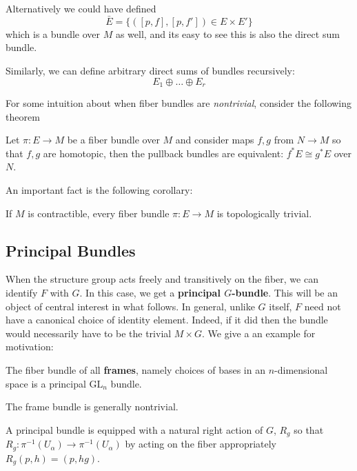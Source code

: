 		Alternatively we could have defined 
		\begin{equation}
			\bar E = \{ ([p, f], [p, f']) \in E \times E'\}
		\end{equation}
		which is a bundle over $M$ as well, and its easy to see this is also the direct sum bundle. 
		
		Similarly, we can define arbitrary direct sums of bundles recursively:
		\begin{equation}
			E_1 \oplus \dots \oplus E_r 
		\end{equation}
		
		
		For some intuition about when fiber bundles are \emph{nontrivial}, consider the following theorem
		\begin{theorem}
			Let $\pi:E \rightarrow M$ be a fiber bundle over $M$ and consider maps $f, g$ from $N \rightarrow M$ so that $f, g$ are homotopic, then the pullback bundles are equivalent: $f^* E \cong g^* E$ over $N$.
		\end{theorem}
		An important fact is the following corollary:
		\begin{cor}
			If $M$ is contractible, every fiber bundle $\pi: E \rightarrow M$ is topologically trivial.
		\end{cor}
		
		\subsection{Principal Bundles}
		
		When the structure group acts freely and transitively on the fiber, we can identify $F$ with $G$. In this case, we get a \textbf{principal $G$-bundle}. This will be an object of central interest in what follows. In general, unlike $G$ itself, $F$ need not have a canonical choice of identity element. Indeed, if it did then the bundle would necessarily have to be the trivial $M \times G$. We give a an example for motivation:
		\begin{eg}
			The fiber bundle of all \textbf{frames}, namely choices of bases in an $n$-dimensional space is a principal $\mathrm{GL}_n$ bundle.
		\end{eg}
		The frame bundle is generally nontrivial. 
		
		\begin{prop}
			A principal bundle is equipped with a natural right action of $G$, $R_g$ so that $R_g: \pi^{-1} (U_\alpha) \rightarrow \pi^{-1} (U_\alpha)$ by acting on the fiber appropriately $R_g (p, h) = (p, hg)$. 
		\end{prop}
		
